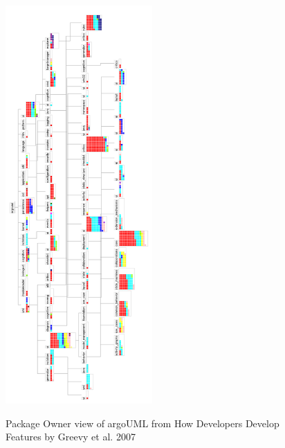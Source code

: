 \begin{figure}[H]
\centering
\includegraphics[width=0.5\textwidth]{./resources/annex_package_owner.png}~
\caption{Package Owner view of argoUML from How Developers Develop Features by Greevy et al. 2007}
\label{fig:annex_package_owner}
\end{figure}

